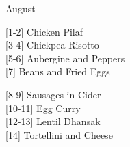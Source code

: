 		\begin{menu}{August}
    
    \begin{recipelist}
    
        {\scriptsize[1-2]} Chicken Pilaf\\
        {\scriptsize[3-4]} Chickpea Risotto\\
        {\scriptsize[5-6]} Aubergine and Peppers\\
        {\scriptsize[7]} Beans and Fried Eggs\\%
    \end{recipelist}%
    \begin{recipelist}
    
        {\scriptsize[8-9]} Sausages in Cider\\
        {\scriptsize[10-11]} Egg Curry\\
        {\scriptsize[12-13]} Lentil Dhansak\\
        {\scriptsize[14]} Tortellini and Cheese\\%
    \end{recipelist}\par%
  

\end{menu}
